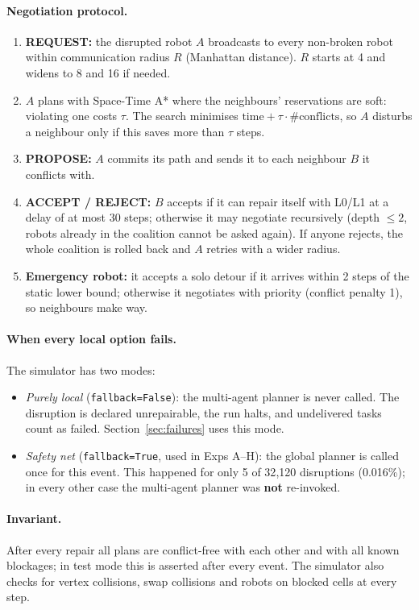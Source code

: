 \documentclass[11pt,a4paper]{article}
\begin{document}
\paragraph{Negotiation protocol.}
\begin{enumerate}
  \item \textbf{REQUEST:} the disrupted robot $A$ broadcasts to every non-broken robot within
  communication radius $R$ (Manhattan distance). $R$ starts at 4 and widens to 8 and 16 if needed.
  \item $A$ plans with Space-Time A* where the neighbours' reservations are soft: violating one costs
  $\tau$. The search minimises $\text{time}+\tau\cdot\#\text{conflicts}$, so $A$ disturbs a neighbour
  only if this saves more than $\tau$ steps.
  \item \textbf{PROPOSE:} $A$ commits its path and sends it to each neighbour $B$ it conflicts with.
  \item \textbf{ACCEPT / REJECT:} $B$ accepts if it can repair itself with L0/L1 at a delay of at most 30
  steps; otherwise it may negotiate recursively (depth $\le 2$, robots already in the coalition cannot be
  asked again). If anyone rejects, the whole coalition is rolled back and $A$ retries with a wider radius.
  \item \textbf{Emergency robot:} it accepts a solo detour if it arrives within 2 steps of the static
  lower bound; otherwise it negotiates with priority (conflict penalty 1), so neighbours make way.
\end{enumerate}

\paragraph{When every local option fails.} The simulator has two modes:
\begin{itemize}
  \item \emph{Purely local} (\texttt{fallback=False}): the multi-agent planner is never called. The
  disruption is declared unrepairable, the run halts, and undelivered tasks count as failed.
  Section~\ref{sec:failures} uses this mode.
  \item \emph{Safety net} (\texttt{fallback=True}, used in Exps A--H): the global planner is called once
  for this event. This happened for only 5 of 32{,}120 disruptions (0.016\%); in every other case the
  multi-agent planner was \textbf{not} re-invoked.
\end{itemize}

\paragraph{Invariant.} After every repair all plans are conflict-free with each other and with all known
blockages; in test mode this is asserted after every event. The simulator also checks for vertex
collisions, swap collisions and robots on blocked cells at every step.
\end{document}
